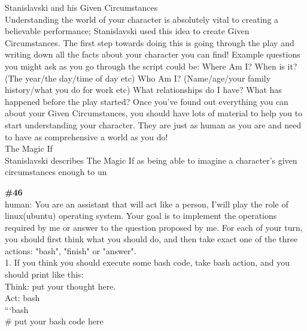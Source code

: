 \documentclass[10pt]{article}
\begin{document}
\begin{Form}
\begin{tcolorbox}[colback=convbg,colframe=itemframe,boxrule=0.8pt,arc=2pt,breakable,left=6pt,right=6pt,top=5pt,bottom=5pt]
{Stanislavski and his Given Circumstances \\[2pt]
Understanding the world of your character is absolutely vital to creating a believable performance; Stanislavski used this idea to create Given Circumstances. The first step towards doing this is going through the play and writing down all the facts about your character you can find! Example questions you might ask as you go through the script could be: Where Am I? When is it? (The year/the day/time of day etc) Who Am I? (Name/age/your family history/what you do for work etc) What relationships do I have? What has happened before the play started? Once you’ve found out everything you can about your Given Circumstances, you should have lots of material to help you to start understanding your character. They are just as human as you are and need to have as comprehensive a world as you do! \\[2pt]
The Magic If \\[2pt]
Stanislavski describes The Magic If as being able to imagine a character’s given circumstances enough to un}
\end{tcolorbox}
\vspace{-1pt}
\CheckBox[name=q45c,width=1.6ex,height=1.6ex,bordercolor={0.45 0.45 0.45}]{~\textcolor{cbox}{COMPACT}}\quad
\CheckBox[name=q45d,width=1.6ex,height=1.6ex,bordercolor={0.45 0.45 0.45}]{~\textcolor{dbox}{DIFFUSE}}\quad
\CheckBox[name=q45n,width=1.6ex,height=1.6ex,bordercolor={0.45 0.45 0.45}]{~\textcolor{nbox}{NONE}}
\vspace{8pt}
\begin{tcolorbox}[colback=convbg,colframe=itemframe,boxrule=0.8pt,arc=2pt,breakable,left=6pt,right=6pt,top=5pt,bottom=5pt]
{\footnotesize\textbf{\#46}}\\[3pt]
{\footnotesize human: You are an assistant that will act like a person, I'will play the role of linux(ubuntu) operating system. Your goal is to implement the operations required by me or answer to the question proposed by me. For each of your turn, you should first think what you should do, and then take exact one of the three actions: "bash", "finish" or "answer". \\[2pt]
1. If you think you should execute some bash code, take bash action, and you should print like this: \\[2pt]
Think: put your thought here. \\[2pt]
Act: bash \\[2pt]
```bash \\[2pt]
\# put your bash code here \\[2pt]
}
\end{tcolorbox}
\end{Form}
\end{document}
